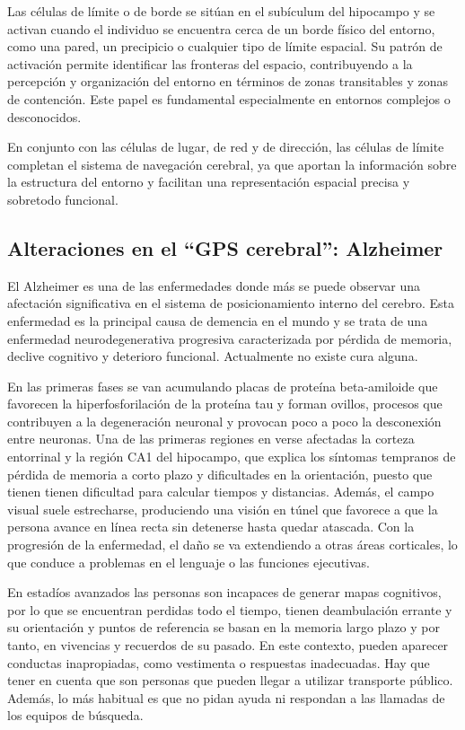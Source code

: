     Las células de límite o de borde se sitúan en el subículum del hipocampo y se activan cuando el individuo se encuentra cerca de un borde físico del entorno, como una pared, un precipicio o cualquier tipo de límite espacial. Su patrón de activación permite identificar las fronteras del espacio, contribuyendo a la percepción y organización del entorno en términos de zonas transitables y zonas de contención. Este papel es fundamental especialmente en entornos complejos o desconocidos.\cite{MapaCognitivo_O_KEEFE, TiposCelulas_GPSCerebral, ManualDeBusquedayRescate}
        
    En conjunto con las células de lugar, de red y de dirección, las células de límite completan el sistema de navegación cerebral, ya que aportan la información sobre la estructura del entorno y facilitan una representación espacial precisa y sobretodo funcional.



    \subsection{Alteraciones en el ``GPS cerebral'': Alzheimer}
    El Alzheimer es una de las enfermedades donde más se puede observar una afectación significativa en el sistema de posicionamiento interno del cerebro. Esta enfermedad es la principal causa de demencia en el mundo y se trata de una enfermedad neurodegenerativa progresiva caracterizada por pérdida de memoria, declive cognitivo y deterioro funcional. Actualmente no existe cura alguna. \cite{alzheimer}

    En las primeras fases se van acumulando placas de proteína beta-amiloide que favorecen la hiperfosforilación de la proteína tau y forman ovillos, procesos que contribuyen a la degeneración neuronal y provocan poco a poco la desconexión entre neuronas. Una de las primeras regiones en verse afectadas la corteza entorrinal y la región CA1 del hipocampo, que explica los síntomas tempranos de pérdida de memoria a corto plazo y dificultades en la orientación, puesto que tienen tienen dificultad para calcular tiempos y distancias. Además, el campo visual suele estrecharse, produciendo una visión en túnel que favorece a que la persona avance en línea recta sin detenerse hasta quedar atascada.  Con la progresión de la enfermedad, el daño se va extendiendo a otras áreas corticales, lo que conduce a problemas en el lenguaje o las funciones ejecutivas.\cite{ManualDeBusquedayRescate}

    En estadíos avanzados las personas son incapaces de generar mapas cognitivos, por lo que se encuentran perdidas todo el tiempo, tienen deambulación errante y su orientación y puntos de referencia se basan en la memoria largo plazo y por tanto, en vivencias y recuerdos de su pasado. En este contexto, pueden aparecer conductas inapropiadas, como vestimenta o respuestas inadecuadas. Hay que tener en cuenta que son personas que pueden llegar a utilizar transporte público. Además, lo más habitual es que no pidan ayuda ni respondan a las llamadas de los equipos de búsqueda.
    
